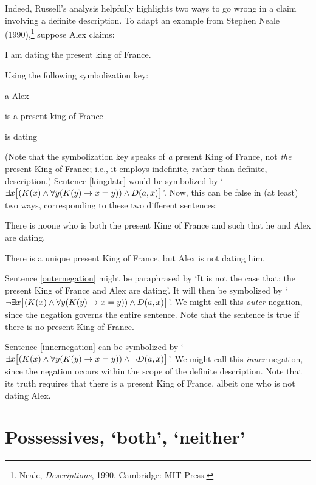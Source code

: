 Indeed, Russell's analysis helpfully highlights two ways to go wrong in a claim involving a definite description. To adapt an example from Stephen Neale (1990),\footnote{Neale, \emph{Descriptions}, 1990, Cambridge: MIT Press.} suppose Alex claims:
	\begin{earg}
		\item[\ex{kingdate}] I am dating the present king of France.
	\end{earg}
Using the following symbolization key:
	\begin{ekey}
		\item[a] Alex
		\item[\atom{K}{x}]  is a present king of France
		\item[\atom{D}{x,y}]  is dating 
	\end{ekey}
	(Note that the symbolization key speaks of \emph{a} present King of France, not \emph{the} present King of France; i.e., it employs indefinite, rather than definite, description.) Sentence \ref{kingdate} would be symbolized by `$\exists x \bigl[(\mathord{K}(x) \wedge \forall y(\mathord{K}(y) \rightarrow  x = y)) \wedge \mathord{D}(a,x)\bigr]$'. Now, this can be false in (at least) two ways, corresponding to these two different sentences:
	\begin{earg}
		\item[\ex{outernegation}] There is noone who is both the present King of France and such that he and Alex are dating.
		\item[\ex{innernegation}] There is a unique present King of France, but Alex is not dating him.
	\end{earg}
Sentence \ref{outernegation} might be paraphrased by `It is not the case that: the present King of France and Alex are dating'. It will then be symbolized by `$\neg \exists x\bigl[(\mathord{K}(x) \wedge \forall y(\mathord{K}(y) \rightarrow  x = y)) \wedge \mathord{D}(a,x) \bigr]$'. We might call this \emph{outer} negation, since the negation governs the entire sentence. Note that the sentence is true if there is no present King of France.

Sentence \ref{innernegation} can be symbolized by `$\exists x \bigl[(\mathord{K}(x) \wedge \forall y(\mathord{K}(y) \rightarrow x = y)) \wedge \neg \mathord{D}(a,x)\bigr]$'. We might call this \emph{inner} negation, since the negation occurs within the scope of the definite description. Note that its truth requires that there is a present King of France, albeit one who is not dating Alex.

\section{Possessives, `both', `neither'}

